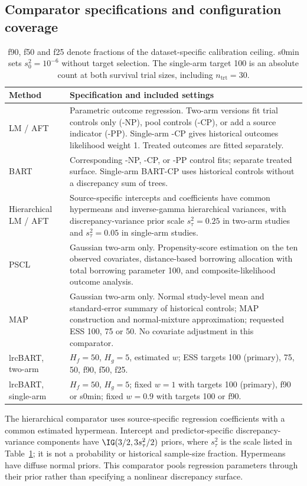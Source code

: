 \subsection{Comparator specifications and configuration coverage}\label{sec:E.4}
\begin{table}[htbp]
\centering\small
\caption{Methods and reporting configurations.}\label{tab:S3}
\begin{tabular}{p{1.2in}p{4.8in}}
\toprule
Method & Specification and included settings\\\midrule
LM / AFT & Parametric outcome regression. Two-arm versions fit trial controls only (-NP), pool controls (-CP), or add a source indicator (-PP). Single-arm -CP gives historical outcomes likelihood weight 1. Treated outcomes are fitted separately.\\
BART & Corresponding -NP, -CP, or -PP control fits; separate treated surface. Single-arm BART-CP uses historical controls without a discrepancy sum of trees.\\
Hierarchical LM / AFT & Source-specific intercepts and coefficients have common hypermeans and inverse-gamma hierarchical variances, with discrepancy-variance prior scale $s_\tau^2=0.25$ in two-arm studies and $s_\tau^2=0.05$ in single-arm studies.\\
PSCL & Gaussian two-arm only. Propensity-score estimation on the ten observed covariates, distance-based borrowing allocation with total borrowing parameter 100, and composite-likelihood outcome analysis.\\
MAP & Gaussian two-arm only. Normal study-level mean and standard-error summary of historical controls; MAP construction and normal-mixture approximation; requested ESS 100, 75 or 50. No covariate adjustment in this comparator.\\
lrcBART, two-arm & $H_f=50$, $H_g=5$, estimated $w$; ESS targets 100 (primary), 75, 50, f90, f50, f25.\\
lrcBART, single-arm & $H_f=50$, $H_g=5$; fixed $w=1$ with targets 100 (primary), f90 or s0min; fixed $w=0.9$ with targets 100 or f90.\\
\bottomrule
\end{tabular}
\caption*{f90, f50 and f25 denote fractions of the dataset-specific calibration ceiling. s0min sets $s_0^2=10^{-6}$ without target selection. The single-arm target 100 is an absolute count at both survival trial sizes, including $n_{\mathrm{trt}}=30$.}
\end{table}

The hierarchical comparator uses source-specific regression coefficients with a common estimated hypermean. Intercept and predictor-specific discrepancy-variance components have $\IG(3/2,3s_\tau^2/2)$ priors, where $s_\tau^2$ is the scale listed in Table~\ref{tab:S3}; it is not a probability or historical sample-size fraction. Hypermeans have diffuse normal priors. This comparator pools regression parameters through their prior rather than specifying a nonlinear discrepancy surface.

